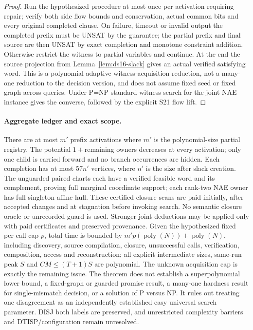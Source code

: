 \documentclass[11pt]{article}
\begin{document}
\begin{proof}
Run the hypothesized procedure at most once per activation requiring repair; verify both side flow bounds and conservation, actual common bits and every original completed clause. On failure, timeout or invalid output the completed prefix must be UNSAT by the guarantee; the partial prefix and final source are then UNSAT by exact completion and monotone constraint addition. Otherwise restrict the witness to partial variables and continue. At the end the source projection from Lemma~\ref{lem:ds16-slack} gives an actual verified satisfying word. This is a polynomial adaptive witness-acquisition reduction, not a many-one reduction to the decision version, and does not assume fixed seed or fixed graph across queries. Under P=NP standard witness search for the joint NAE instance gives the converse, followed by the explicit S21 flow lift.
\end{proof}

\paragraph{Aggregate ledger and exact scope.}
There are at most $m'$ prefix activations where $m'$ is the polynomial-size partial registry. The potential $1+$remaining owners decreases at every activation; only one child is carried forward and no branch occurrences are hidden. Each completion has at most $57n'$ vertices, where $n'$ is the size after slack creation. The unguarded paired charts each have a verified feasible word and its complement, proving full marginal coordinate support; each rank-two NAE owner has full singleton affine hull. These certified closure scans are paid initially, after accepted changes and at stagnation before invoking search. No semantic closure oracle or unrecorded guard is used. Stronger joint deductions may be applied only with paid certificates and preserved provenance. Given the hypothesized fixed per-call cap $p$, total time is bounded by $m'p(\operatorname{poly}(N))+\operatorname{poly}(N)$, including discovery, source compilation, closure, unsuccessful calls, verification, composition, access and reconstruction; all explicit intermediate sizes, same-run peak $S$ and $CM\le(T+1)S$ are polynomial. The unknown acquisition cap is exactly the remaining issue. The theorem does not establish a superpolynomial lower bound, a fixed-graph or guarded promise result, a many-one hardness result for single-mismatch decision, or a solution of P versus NP. It rules out treating one disagreement as an independently established easy universal search parameter. DISJ both labels are preserved, and unrestricted complexity barriers and DTISP/configuration remain unresolved.
\end{document}
